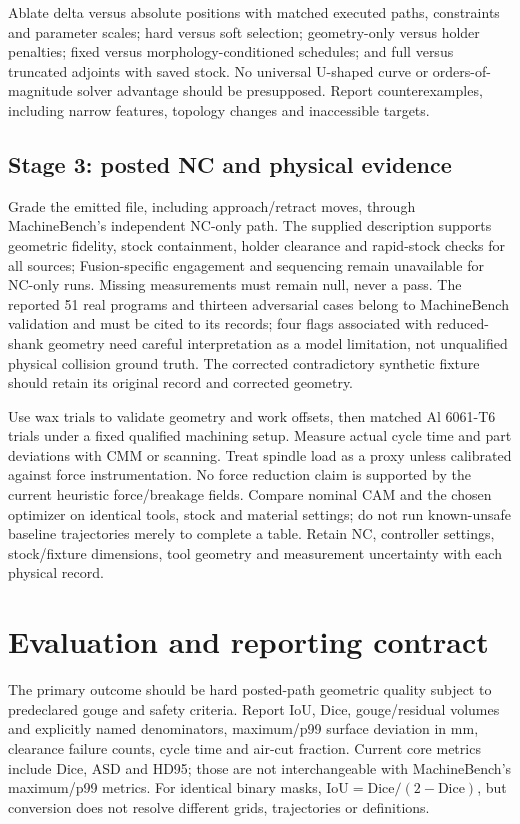 \documentclass[11pt]{article}
\begin{document}
Ablate delta versus absolute positions with matched executed paths, constraints
and parameter scales; hard versus soft selection; geometry-only versus holder
penalties; fixed versus morphology-conditioned schedules; and full versus
truncated adjoints with saved stock. No universal U-shaped curve or orders-of-
magnitude solver advantage should be presupposed. Report counterexamples,
including narrow features, topology changes and inaccessible targets.

\subsection{Stage 3: posted NC and physical evidence}
Grade the emitted file, including approach/retract moves, through MachineBench's
independent NC-only path. The supplied description supports geometric fidelity,
stock containment, holder clearance and rapid-stock checks for all sources;
Fusion-specific engagement and sequencing remain unavailable for NC-only runs.
Missing measurements must remain null, never a pass. The reported 51 real
programs and thirteen adversarial cases belong to MachineBench validation and
must be cited to its records; four flags associated with reduced-shank geometry
need careful interpretation as a model limitation, not unqualified physical
collision ground truth. The corrected contradictory synthetic fixture should
retain its original record and corrected geometry.

Use wax trials to validate geometry and work offsets, then matched Al 6061-T6
trials under a fixed qualified machining setup. Measure actual cycle time and
part deviations with CMM or scanning. Treat spindle load as a proxy unless
calibrated against force instrumentation. No force reduction claim is supported
by the current heuristic force/breakage fields. Compare nominal CAM and the
chosen optimizer on identical tools, stock and material settings; do not run
known-unsafe baseline trajectories merely to complete a table. Retain NC,
controller settings, stock/fixture dimensions, tool geometry and measurement
uncertainty with each physical record.

\section{Evaluation and reporting contract}
The primary outcome should be hard posted-path geometric quality subject to
predeclared gouge and safety criteria. Report IoU, Dice, gouge/residual volumes
and explicitly named denominators, maximum/p99 surface deviation in mm,
clearance failure counts, cycle time and air-cut fraction. Current core metrics
include Dice, ASD and HD95; those are not interchangeable with MachineBench's
maximum/p99 metrics. For identical binary masks,
$\mathrm{IoU}=\mathrm{Dice}/(2-\mathrm{Dice})$, but conversion does not resolve
different grids, trajectories or definitions.
\end{document}
